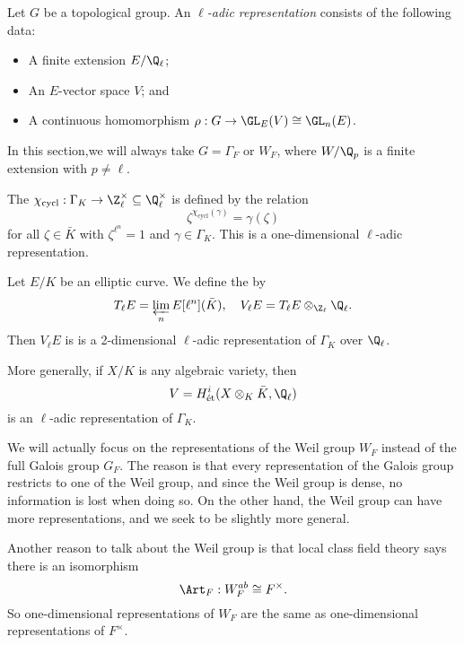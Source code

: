 \documentclass[a4paper]{article}
\begin{document}
\begin{defi}
  Let $G$ be a topological group. An \emph{$\ell$-adic representation} consists of the following data:
  \begin{itemize}
    \item A finite extension $E/\Q_{\ell}$;
    \item An $E$-vector space $V$; and
    \item A continuous homomorphism $\rho: G \to \GL_E(V) \cong \GL_n(E)$.
  \end{itemize}
\end{defi}

In this section,we will always take $G = \Gamma_F$ or $W_F$, where $W/\Q_p$ is a finite extension with $p \not= \ell$.
\begin{eg}
  The  $\chi_{\mathrm{cycl}}: \Gamma_K \to \Z_\ell^\times \subseteq \Q_\ell^\times$ is defined by the relation
  \[
    \zeta^{\chi_{\mathrm{cycl}}(\gamma)} = \gamma(\zeta)
  \]
  for all $\zeta \in \bar{K}$ with $\zeta^{\ell^n} = 1$ and $\gamma \in \Gamma_K$. This is a one-dimensional $\ell$-adic representation.
\end{eg}

\begin{eg}
  Let $E/K$ be an elliptic curve. We define the  by
  \[
    T_\ell E = \varprojlim_n E[\ell^n](\bar{K}),\quad V_\ell E = T_\ell E \otimes_{\Z_\ell} \Q_{\ell}.
  \]
  Then $V_\ell E$ is is a 2-dimensional $\ell$-adic representation of $\Gamma_K$ over $\Q_\ell$.
\end{eg}

\begin{eg}
  More generally, if $X/K$ is any algebraic variety, then
  \[
    V = H^i_{\text{\'et}}(X \otimes_K \bar{K}, \Q_\ell)
  \]
  is an $\ell$-adic representation of $\Gamma_K$.
\end{eg}

We will actually focus on the representations of the Weil group $W_F$ instead of the full Galois group $G_F$. The reason is that every representation of the Galois group restricts to one of the Weil group, and since the Weil group is dense, no information is lost when doing so. On the other hand, the Weil group can have more representations, and we seek to be slightly more general.

Another reason to talk about the Weil group is that local class field theory says there is an isomorphism
\[
  \Art_F: W_F^{ab} \cong F^\times.
\]
So one-dimensional representations of $W_F$ are the same as one-dimensional representations of $F^\times$.%
\end{document}

